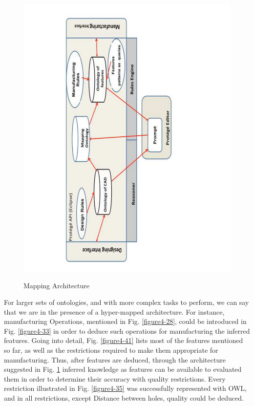 \begin{figure}
\begin{center}
	\includegraphics[scale=0.5, angle=270]{figure-chapterIV/fig4-34}\\
	\vspace{-60}
	\caption{Mapping Architecture}
	\label{figure4-34}
\end{center}
\end{figure}


For larger sets of ontologies, and with more complex tasks to perform, we can say that we are in the presence of a hyper-mapped architecture. For instance, manufacturing Operations, mentioned in Fig. \ref{figure4-28}, could be introduced in Fig. \ref{figure4-33} in order to deduce such operations for manufacturing the inferred features. Going into detail, Fig. \ref{figure4-41} lists most of the features mentioned so far, as well as the restrictions required to make them appropriate for manufacturing. Thus, after features are deduced, through the architecture suggested in Fig. \ref{figure4-34} inferred knowledge as features can be available to evaluated  them in order to determine their accuracy with quality restrictions. Every restriction illustrated in Fig. \ref{figure4-35} was successfully represented with OWL, and in all restrictions,    except Distance between holes, quality could be deduced. 



